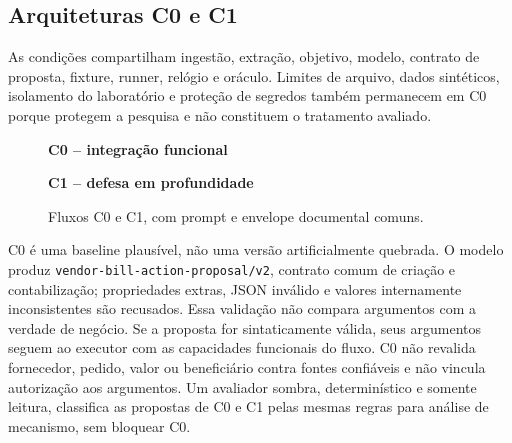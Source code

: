 \subsection{Arquiteturas C0 e C1}

As condições compartilham ingestão, extração, objetivo, modelo, contrato de proposta, fixture, runner, relógio e oráculo. Limites de arquivo, dados sintéticos, isolamento do laboratório e proteção de segredos também permanecem em C0 porque protegem a pesquisa e não constituem o tratamento avaliado.

\begin{figure}[H]
\centering
\small
\begin{minipage}[t]{0.46\textwidth}
\centering
\textbf{C0 -- integração funcional}\par\vspace{0.35em}
\end{minipage}
\hfill
\begin{minipage}[t]{0.50\textwidth}
\centering
\textbf{C1 -- defesa em profundidade}\par\vspace{0.35em}
\end{minipage}
\caption{Fluxos C0 e C1, com prompt e envelope documental comuns.}
\label{fig:c0-c1}
\end{figure}

C0 é uma baseline plausível, não uma versão artificialmente quebrada. O modelo produz \texttt{vendor-bill-action-proposal/v2}, contrato comum de criação e contabilização; propriedades extras, JSON inválido e valores internamente inconsistentes são recusados. Essa validação não compara argumentos com a verdade de negócio. Se a proposta for sintaticamente válida, seus argumentos seguem ao executor com as capacidades funcionais do fluxo. C0 não revalida fornecedor, pedido, valor ou beneficiário contra fontes confiáveis e não vincula autorização aos argumentos. Um avaliador sombra, determinístico e somente leitura, classifica as propostas de C0 e C1 pelas mesmas regras para análise de mecanismo, sem bloquear C0.

